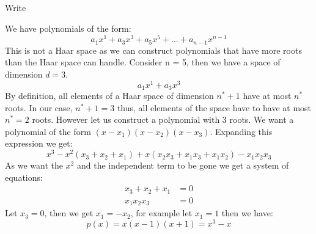 \begin{problem}
Write
\end{problem}

\begin{solution}
We have polynomials of the form:
\begin{equation*}
a_1x^1+a_3x^3+a_5x^5+\ldots+a_{n-1}x^{n-1}
\end{equation*}
This is not a Haar space as we can construct polynomials that have more roots than the Haar space can handle. Consider n = 5, then we have a space of dimension $d=3$.
\begin{equation*}
a_1x^1+a_3x^3
\end{equation*}
By definition, all elements of a Haar space of dimension $n^*+1$ have at most $n^*$ roots. In our case, $n^*+1 = 3$ thus, all elements of the space have to have at most $n^*=2$ roots. However let us construct a polynomial with 3 roots. We want a polynomial of the form $(x-x_1)(x-x_2)(x-x_3)$. Expanding this expression we get:
\begin{equation*}
x^3-x^2(x_3+x_2+x_1)+x(x_2x_3+x_1x_3+x_1x_2)-x_1x_2x_3
\end{equation*}
As we want the $x^2$ and the independent term to be gone we get a system of equations:
\begin{align*}
x_3+x_2+x_1 &= 0 \\
x_1x_2x_3 &= 0
\end{align*}
Let $x_3 = 0$, then we get $x_1 = -x_2$, for example let $x_1 = 1$ then we have:
\begin{equation*}
p(x) = x(x-1)(x+1) = x^3-x
\end{equation*}
\end{solution}